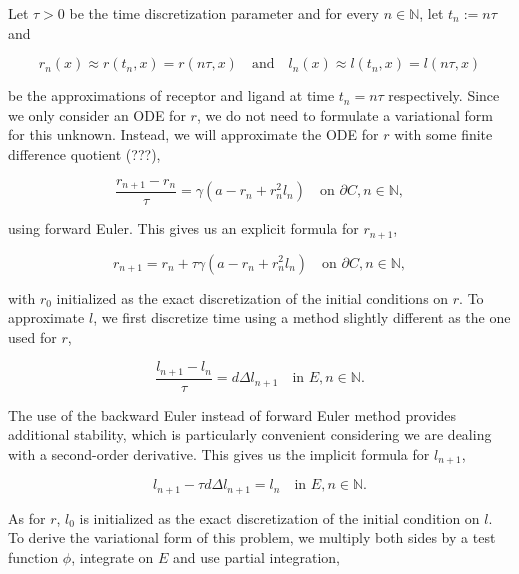 \documentclass{book}
\theoremstyle{definition}
\begin{document}
Let $\tau > 0$ be the time discretization parameter and for every $n \in \mathbb{N}$, let $t_n := n\tau$ and

\begin{equation}
    r_n(x) \approx r(t_n, x) = r(n\tau, x) \quad \text{and} \quad l_n(x) \approx l(t_n, x) = l(n\tau, x)
\end{equation}

\noindent
be the approximations of receptor and ligand at time $t_n = n\tau$ respectively. Since we only consider an ODE for $r$, we do not need to formulate a variational form for this unknown. Instead, we will approximate the ODE for $r$ with some finite difference quotient (???),

\begin{equation}
        \frac{r_{n + 1} - r_{n}}{\tau} = \gamma (a - r_{n} + r_{n}^{2}l_{n}) \quad \text{on } \partial C, n \in \mathbb{N},
\end{equation}

\noindent
using forward Euler. This gives us an explicit formula for $r_{n + 1}$,

\begin{equation}
        r_{n + 1} = r_{n} + \tau \gamma \left( a - r_{n} + r_{n}^{2}l_{n} \right) \quad \text{on } \partial C, n \in \mathbb{N},
\end{equation}

\noindent
with $r_{0}$ initialized as the exact discretization of the initial conditions on $r$. To approximate $l$, we first discretize time using a method slightly different as the one used for $r$,

\begin{equation}
        \frac{l_{n + 1} - l_{n}}{\tau} = d \Delta l_{n + 1} \quad \text{in } E, n \in \mathbb{N}.
\end{equation}

\noindent
The use of the backward Euler instead of forward Euler method provides additional stability, which is particularly convenient considering we are dealing with a second-order derivative. This gives us the implicit formula for $l_{n + 1}$,

\begin{equation}
        l_{n + 1} - \tau d \Delta l_{n + 1} = l_{n} \quad \text{in } E, n \in \mathbb{N}.
\end{equation}

\noindent
As for $r$, $l_{0}$ is initialized as the exact discretization of the initial condition on $l$. To derive the variational form of this problem, we multiply both sides by a test function $\phi$, integrate on $E$ and use partial integration,
\end{document}
